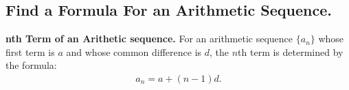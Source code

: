 \documentclass{report}
\begin{document}
   \subsection{
     Find a Formula For an Arithmetic Sequence.
   }
   \bigbreak \noindent 
   \begin{mdframed}
     \textbf{nth Term of an Arithetic sequence.}
     \bigbreak \noindent 
      For an arithmetic sequence \(\{a_n\}\) whose first term is \(a\) and whose common difference is \(d\), the \(n\)th term is determined by the formula:
      \begin{align*}
        a_{n} = a + (n-1)d
      .\end{align*}
   \end{mdframed}
   \bigbreak \noindent 
   \bigbreak \noindent 
\end{document}
